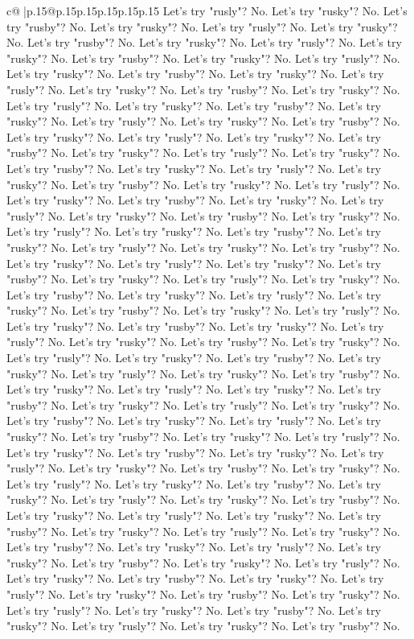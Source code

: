 \documentclass{article}
\begin{document}
{\begin{supertabular}{c@{$\;$}|p{.15\linewidth}@{}p{.15\linewidth}p{.15\linewidth}p{.15\linewidth}p{.15\linewidth}p{.15\linewidth}}
{{{Let's try "rusly"? No. Let's try "rusky"? No. Let's try "rusby"? No. Let's try "rusky"? No. Let's try "rusly"? No. Let's try "rusky"? No. Let's try "rusby"? No. Let's try "rusky"? No. Let's try "rusly"? No. Let's try "rusky"? No. Let's try "rusby"? No. Let's try "rusky"? No. Let's try "rusly"? No. Let's try "rusky"? No. Let's try "rusby"? No. Let's try "rusky"? No. Let's try "rusly"? No. Let's try "rusky"? No. Let's try "rusby"? No. Let's try "rusky"? No. Let's try "rusly"? No. Let's try "rusky"? No. Let's try "rusby"? No. Let's try "rusky"? No. Let's try "rusly"? No. Let's try "rusky"? No. Let's try "rusby"? No. Let's try "rusky"? No. Let's try "rusly"? No. Let's try "rusky"? No. Let's try "rusby"? No. Let's try "rusky"? No. Let's try "rusly"? No. Let's try "rusky"? No. Let's try "rusby"? No. Let's try "rusky"? No. Let's try "rusly"? No. Let's try "rusky"? No. Let's try "rusby"? No. Let's try "rusky"? No. Let's try "rusly"? No. Let's try "rusky"? No. Let's try "rusby"? No. Let's try "rusky"? No. Let's try "rusly"? No. Let's try "rusky"? No. Let's try "rusby"? No. Let's try "rusky"? No. Let's try "rusly"? No. Let's try "rusky"? No. Let's try "rusby"? No. Let's try "rusky"? No. Let's try "rusly"? No. Let's try "rusky"? No. Let's try "rusby"? No. Let's try "rusky"? No. Let's try "rusly"? No. Let's try "rusky"? No. Let's try "rusby"? No. Let's try "rusky"? No. Let's try "rusly"? No. Let's try "rusky"? No. Let's try "rusby"? No. Let's try "rusky"? No. Let's try "rusly"? No. Let's try "rusky"? No. Let's try "rusby"? No. Let's try "rusky"? No. Let's try "rusly"? No. Let's try "rusky"? No. Let's try "rusby"? No. Let's try "rusky"? No. Let's try "rusly"? No. Let's try "rusky"? No. Let's try "rusby"? No. Let's try "rusky"? No. Let's try "rusly"? No. Let's try "rusky"? No. Let's try "rusby"? No. Let's try "rusky"? No. Let's try "rusly"? No. Let's try "rusky"? No. Let's try "rusby"? No. Let's try "rusky"? No. Let's try "rusly"? No. Let's try "rusky"? No. Let's try "rusby"? No. Let's try "rusky"? No. Let's try "rusly"? No. Let's try "rusky"? No. Let's try "rusby"? No. Let's try "rusky"? No. Let's try "rusly"? No. Let's try "rusky"? No. Let's try "rusby"? No. Let's try "rusky"? No. Let's try "rusly"? No. Let's try "rusky"? No. Let's try "rusby"? No. Let's try "rusky"? No. Let's try "rusly"? No. Let's try "rusky"? No. Let's try "rusby"? No. Let's try "rusky"? No. Let's try "rusly"? No. Let's try "rusky"? No. Let's try "rusby"? No. Let's try "rusky"? No. Let's try "rusly"? No. Let's try "rusky"? No. Let's try "rusby"? No. Let's try "rusky"? No. Let's try "rusly"? No. Let's try "rusky"? No. Let's try "rusby"? No. Let's try "rusky"? No. Let's try "rusly"? No. Let's try "rusky"? No. Let's try "rusby"? No. Let's try "rusky"? No. Let's try "rusly"? No. Let's try "rusky"? No. Let's try "rusby"? No. Let's try "rusky"? No. Let's try "rusly"? No. Let's try "rusky"? No. Let's try "rusby"? No. Let's try "rusky"? No. Let's try "rusly"? No. Let's try "rusky"? No. Let's try "rusby"? No. Let's try "rusky"? No. Let's try "rusly"? No. Let's try "rusky"? No. Let's try "rusby"? No. Let's try "rusky"? No. Let's try "rusly"? No. Let's try "rusky"? No. Let's try "rusby"? No. }}}
\end{supertabular}}
\end{document}
